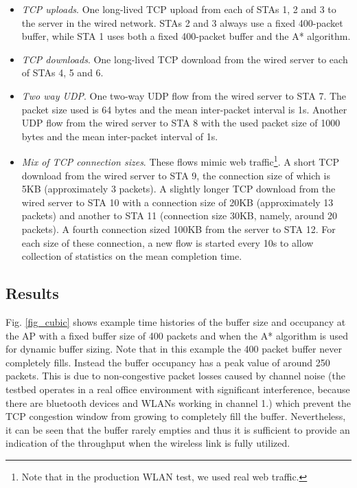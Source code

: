 \documentclass[10pt,twocolumn, journal]{IEEEtran}
\begin{document}
\begin{itemize}

\item \emph{TCP uploads}. One long-lived TCP upload from each of STAs 1, 2 and 3 to the
server in the wired network. STAs 2 and 3 always use a fixed 400-packet buffer, while STA
1 uses both a fixed 400-packet buffer and the A* algorithm.

\item \emph{TCP downloads}. One long-lived TCP download from the wired server to each of
STAs 4, 5 and 6.

\item \emph{Two way UDP}.  One two-way UDP flow from the wired server to STA 7. The packet size used is 64 bytes and the mean inter-packet interval is 1s.  Another UDP flow from the wired server to STA 8 with the used packet size of 1000 bytes and the mean inter-packet interval of 1s.

\item \emph{Mix of TCP connection sizes}.  These flows mimic web traffic\footnote{Note that in the production WLAN test, we used real web traffic.}. A short TCP download from the wired server to STA 9, the connection size of which is 5KB (approximately 3 packets).   A slightly longer TCP download from the wired server to STA 10 with a connection size of 20KB (approximately 13 packets) and another to STA 11 (connection size 30KB, namely, around 20 packets).  A fourth connection sized 100KB from the server to STA 12.  For each size of these connection, a new flow is started every 10s to allow collection of statistics on the mean completion time.

\end{itemize}



\subsection{Results}

Fig. \ref{fig_cubic} shows example time histories of the buffer size and occupancy at the AP with a fixed buffer size
of 400 packets and when the A* algorithm is used for dynamic buffer sizing.  Note that in this example the 400 packet
buffer never completely fills. Instead the buffer occupancy has a peak value of around 250 packets.  This is due to
non-congestive packet losses caused by channel noise (the testbed operates in a real office environment with
significant interference, because there are bluetooth devices and WLANs working in channel 1.) which prevent the TCP congestion window from growing to completely fill the buffer. Nevertheless, it can be seen that the buffer rarely empties and thus it is sufficient to provide an indication of the throughput when the wireless link is fully utilized.
\end{document}
